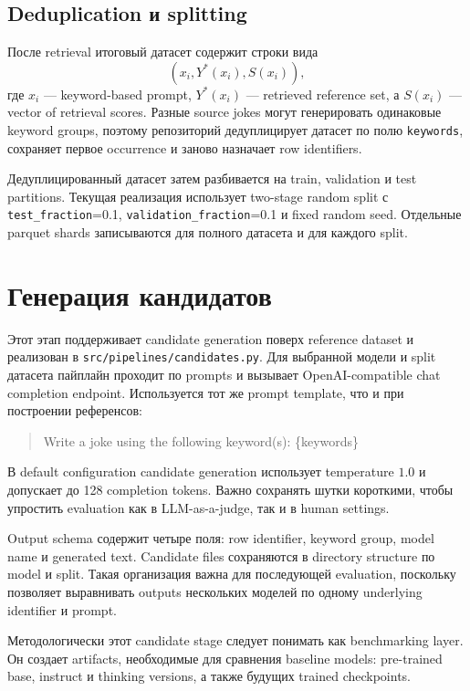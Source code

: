 \subsection{Deduplication и splitting}

После retrieval итоговый датасет содержит строки вида
\[
    (x_i, Y^{*}(x_i), S(x_i)),
\]
где \(x_i\) --- keyword-based prompt, \(Y^{*}(x_i)\) --- retrieved reference set, а \(S(x_i)\) --- vector of retrieval scores. Разные source jokes могут генерировать одинаковые keyword groups, поэтому репозиторий дедуплицирует датасет по полю \texttt{keywords}, сохраняет первое occurrence и заново назначает row identifiers.

Дедуплицированный датасет затем разбивается на train, validation и test partitions. Текущая реализация использует two-stage random split с \texttt{test\_fraction}=0.1, \texttt{validation\_fraction}=0.1 и fixed random seed. Отдельные parquet shards записываются для полного датасета и для каждого split.

\section{Генерация кандидатов}

Этот этап поддерживает candidate generation поверх reference dataset и реализован в \texttt{src/pipelines/candidates.py}. Для выбранной модели и split датасета пайплайн проходит по prompts и вызывает OpenAI-compatible chat completion endpoint. Используется тот же prompt template, что и при построении референсов:
\begin{quote}
    \ttfamily
    Write a joke using the following keyword(s): \{keywords\}
\end{quote}
В default configuration candidate generation использует temperature \(1.0\) и допускает до 128 completion tokens. Важно сохранять шутки короткими, чтобы упростить evaluation как в LLM-as-a-judge, так и в human settings.

Output schema содержит четыре поля: row identifier, keyword group, model name и generated text. Candidate files сохраняются в directory structure по model и split. Такая организация важна для последующей evaluation, поскольку позволяет выравнивать outputs нескольких моделей по одному underlying identifier и prompt.

Методологически этот candidate stage следует понимать как benchmarking layer. Он создает artifacts, необходимые для сравнения baseline models: pre-trained base, instruct и thinking versions, а также будущих trained checkpoints.

